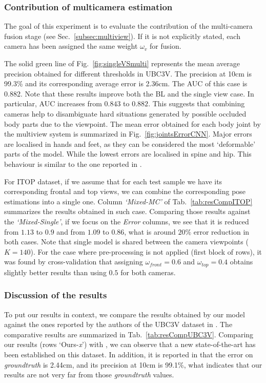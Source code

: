 \documentclass[review,12pt,3p]{elsarticle}
\begin{document}
\subsubsection{Contribution of multicamera estimation}
% 
The goal of this experiment is to evaluate the contribution of the multi-camera fusion stage (see Sec.~\ref{subsec:multiview}). If it is not explicitly stated, each camera has been assigned the same weight $\omega_v$ for fusion.

The solid green line of Fig.~\ref{fig:singleVSmulti} represents the mean average precision obtained for different thresholds in UBC3V. 
The precision at 10cm is 99.3\% and its corresponding average error is 2.36cm. 
The AUC of this case is 0.882.
Note that these results improve both the BL and the single view case. In particular, AUC increases from $0.843$ to $0.882$. This suggests that combining cameras help to disambiguate hard situations generated by possible occluded body parts due to the viewpoint.
%
The mean error obtained for each body joint by the multiview system is summarized in Fig.~\ref{fig:jointsErrorCNN}. Major errors are localised in hands and feet, as they can be considered the most `deformable' parts of the model. While the lowest errors are localised in spine and hip. This behaviour is similar to the one reported in \citep{Shafaei16}.



For ITOP dataset, if we assume that for each test sample we have its corresponding frontal and top views, we can combine the corresponding pose estimations into a single one. Column \textit{`Mixed-MC'} of Tab.~\ref{tab:resCompITOP} summarizes the results obtained in such case. Comparing those results against the \textit{`Mixed-Single'}, if we focus on the \textit{Error} columns, we see that it is reduced from $1.13$ to $0.9$ and from $1.09$ to $0.86$, what is around $20\%$ error reduction in both cases. Note that single model is shared between the camera viewpoints ($K=140$).
%
For the case where pre-processing is not applied (first block of rows), it was found by cross-validation that assigning $\omega_{front}=0.6$ and $\omega_{top}=0.4$ obtains slightly better results than using $0.5$ for both cameras.
 
\subsubsection{Discussion of the results}
%
To put our results in context, we compare the results obtained by our model against the ones reported by the authors of the UBC3V dataset in \citep{Shafaei16}. The comparative results are summarized in Tab.~\ref{tab:resCompUBC3V}. 
Comparing our results (rows `Ours-\textit{x}') with \citep{Shafaei16}, we can observe that a new state-of-the-art has been established on this dataset.
In addition, it is reported in \citep{Shafaei16} that the error on \textit{groundtruth} is 2.44cm, and its precision at 10cm is 99.1\%, what indicates that our results are not very far from those \textit{groundtruth} values.
\end{document}
